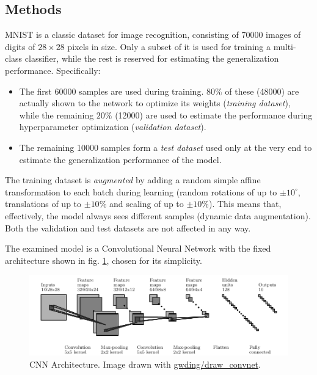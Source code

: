 \documentclass[11pt,a4paper]{scrartcl}
\begin{document}
\subsection{Methods}
MNIST is a classic dataset for image recognition, consisting of \num{70000} images of digits of $28\times28$ pixels in size. Only a subset of it is used for training a multi-class classifier, while the rest is reserved for estimating the generalization performance. Specifically:
\begin{itemize}
    \item The first \num{60000} samples are used during training. $80\%$ of these (\num{48000}) are actually shown to the network to optimize its weights (\textit{training dataset}), while the remaining $20\%$ (\num{12000}) are used to estimate the performance during hyperparameter optimization (\textit{validation dataset}).
    \item The remaining \num{10000} samples form a \textit{test dataset} used only at the very end to estimate the generalization performance of the model.
\end{itemize}
The training dataset is \textit{augmented} by adding a random simple affine transformation to each batch during learning (random rotations of up to $\pm 10^\circ$, translations of up to $\pm 10\%$ and scaling of up to $\pm 10\%$). This means that, effectively, the model always sees different samples (dynamic data augmentation). Both the validation and test datasets are not affected in any way.

\medskip

The examined model is a Convolutional Neural Network with the fixed architecture shown in fig. \ref{fig:cnn_architecture}, chosen for its simplicity. 

\begin{figure}[H]
    \centering
    \includegraphics[width=\textwidth]{../02_Classification/Plots/convnet_fig}
    \caption{CNN Architecture. Image drawn with \href{https://github.com/gwding/draw_convnet}{gwding/draw\_convnet}.\label{fig:cnn_architecture}}
\end{figure}
\end{document}
